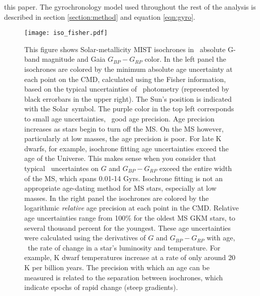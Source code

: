 this paper.
The gyrochronology model used throughout the rest of the analysis is described
in section \ref{section:method} and equation \ref{eqn:gyro}.


\begin{figure}
  \caption{
    This figure shows Solar-metallicity MIST isochrones in \Gaia\ absolute
    G-band magnitude and Gaia $G_{BP} - G_{RP}$ color.
    In the left panel the isochrones are colored by the minimum absolute age
    uncertainty at each point on the CMD, calculated using the Fisher
    information, based on the typical uncertainties of \Gaia\ photometry
    (represented by black errorbars in the upper right).
    The Sun's position \citep{casagrande2018} is indicated with the Solar\
    symbol.
    The purple color in the top left corresponds to small age uncertainties,
    \ie\ good age precision.
    Age precision increases as stars begin to turn off the MS.
    On the MS however, particularly at low masses, the age precision is poor.
    For late K dwarfs, for example, isochrone fitting age uncertainties exceed
    the age of the Universe.
    This makes sense when you consider that typical \Gaia\ uncertaintes on $G$
    and $G_{BP} - G_{RP}$ exceed the entire width of the MS, which spans
    0.01-14 Gyrs.
    Isochrone fitting is not an appropriate age-dating method for MS stars,
    especially at low masses.
    In the right panel the isochrones are colored by the logarithmic
    {\it relative} age precision at each point in the CMD.
    Relative age uncertainties range from 100\% for the oldest MS GKM stars,
    to several thousand percent for the youngest.
    These age uncertainties were calculated using the derivatives of $G$ and
    $G_{BP} - G_{RP}$ with age, \ie\ the rate of change in a star's luminosity
    and temperature.
    For example, K dwarf temperatures increase at a rate of only around 20 K
    per billion years.
    The precision with which an age can be measured is related to the
    separation between isochrones, which indicate epochs of rapid change
    (steep gradients).
    \label{fig:fischer_iso}
}
  \centering
    \texttt{[image: iso\_fisher.pdf]}
\label{fig:iso_fisher}
\end{figure}

